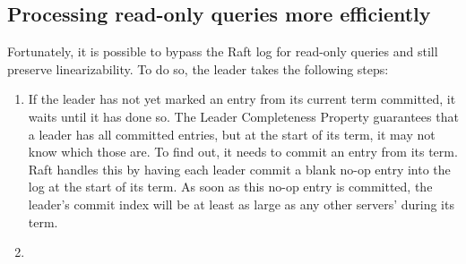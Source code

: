\documentclass[11pt]{article}
\begin{document}
\subsection{Processing read-only queries more efficiently}
\label{sec:org6a9c2b7}
Fortunately, it is possible to bypass the Raft log for read-only queries and still preserve
linearizability. To do so, the leader takes the following steps:
\begin{enumerate}
\item If the leader has not yet marked an entry from its current term committed, it waits until it has
done so. The Leader Completeness Property guarantees that a leader has all committed entries, but
at the start of its term, it may not know which those are. To find out, it needs to commit an entry
from its term. Raft handles this by having each leader commit a blank no-op entry into the log at
the start of its term. As soon as this no-op entry is committed, the leader’s commit index will be at least as large as any other servers’ during its term.
\item 
\end{enumerate}
\end{document}
